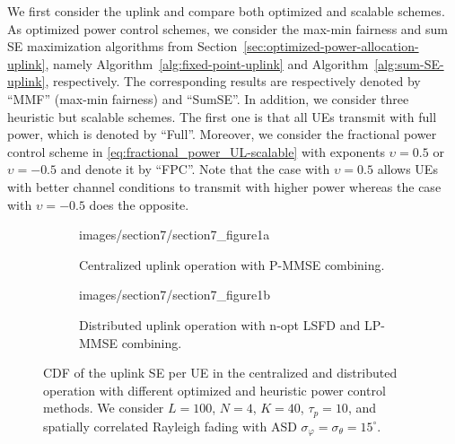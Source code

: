 We first consider the uplink and compare both optimized and scalable schemes.
As optimized power control schemes, we consider the max-min fairness and sum SE maximization algorithms from Section~\ref{sec:optimized-power-allocation-uplink}, namely Algorithm~\ref{alg:fixed-point-uplink} and Algorithm~\ref{alg:sum-SE-uplink}, respectively. The corresponding results are respectively denoted by ``\gls{MMF}'' (max-min fairness) and ``SumSE''. In addition, we consider three heuristic but scalable schemes. The first one is that all UEs transmit with full power, which is denoted by ``Full''. Moreover, we consider the fractional power control scheme in \eqref{eq:fractional_power_UL-scalable} with exponents $\upsilon=0.5$ or $\upsilon=-0.5$ and denote it  by ``\gls{FPC}''. Note that the case with $\upsilon=0.5$ allows UEs with better channel conditions to transmit with higher power whereas the case with $\upsilon=-0.5$ does the opposite.

\label{sec:performance-comparison-power-allocation}
\begin{figure}[p!]
	\begin{subfigure}[b]{\columnwidth} \centering 
		\begin{overpic}[width=0.88\columnwidth,tics=10]{images/section7/section7_figure1a}
		\end{overpic} \label{figureSec7_1a}
		\caption{Centralized uplink operation with P-MMSE combining.} 
		\vspace{4mm}
	\end{subfigure} 
	\begin{subfigure}[b]{\columnwidth} \centering 
		\begin{overpic}[width=0.88\columnwidth,tics=10]{images/section7/section7_figure1b}
		\end{overpic} \label{figureSec7_1b}
		\caption{Distributed uplink operation with n-opt LSFD and LP-MMSE combining.} 
	\end{subfigure} 
	\caption{CDF of the uplink SE per UE in the centralized and distributed operation with different optimized and heuristic power control methods. We consider $L=100$, $N=4$, $K=40$, $\tau_p=10$, and spatially correlated Rayleigh  fading with ASD $\sigma_{\varphi}=\sigma_{\theta}=15^{\circ}$.}\label{figureSec7_1}
\end{figure}


